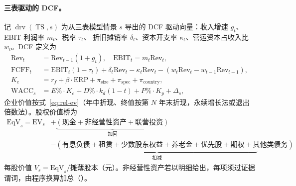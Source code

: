 \paragraph{三表驱动的 DCF。}
记 $\operatorname{drv}(\operatorname{TS},s)$ 为从三表模型情景 $s$ 导出的 DCF 驱动向量：收入增速 $g_t$、EBIT 利润率 $m_t$、税率 $\tau_t$、
折旧摊销率 $\delta_t$、资本开支率 $\kappa_t$、营运资本占收入比 $w_t$。DCF 定义为
\begin{align}
\text{Rev}_t &= \text{Rev}_{t-1}(1+g_t),\quad \text{EBIT}_t = m_t\text{Rev}_t,\\
\text{FCFF}_t &= \text{EBIT}_t(1-\tau_t) + \delta_t\text{Rev}_t - \kappa_t\text{Rev}_t - (w_t\text{Rev}_t - w_{t-1}\text{Rev}_{t-1}),\\
K_e &= r_f + \beta\cdot\text{ERP} + \pi_{\text{size}} + \pi_{\text{spec}} + \pi_{\text{country}},\\
\text{WACC}_s &= E\%\cdot K_e + D\%\cdot k_d(1-t) + P\%\cdot K_p + \Delta_s,
\end{align}
企业价值按式~\eqref{eq:rel-ev}（年中折现、终值按第 $N$ 年末折现，永续增长法或退出倍数法）。股权价值桥为
\begin{equation}
\begin{split}
\text{EqV}_s = \text{EV}_s &+ \underbrace{(\text{现金}+\text{非经营性资产}+\text{联营投资})}_{\text{加回}}\\
&- \underbrace{(\text{有息负债}+\text{租赁}+\text{少数股东权益}+\text{养老金}+\text{优先股}+\text{期权}+\text{其他类债务})}_{\text{扣减}},
\end{split}
\label{eq:prob-bridgeeq}
\end{equation}
每股价值 $V_s=\text{EqV}_s/\text{摊薄股本}$（元）。非经营性资产若以明细给出，每项须过证据谓词，由程序换算加总（）。

